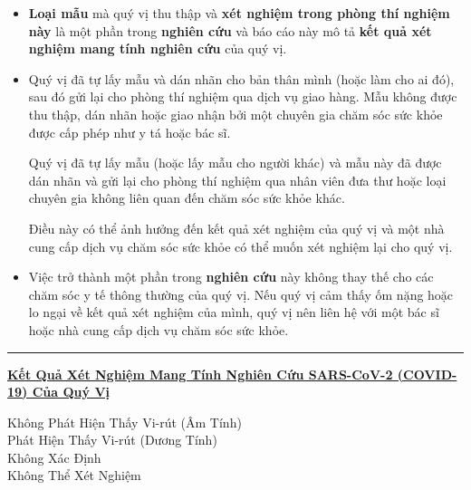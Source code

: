 \documentclass[10pt]{article}
\newcommand{\PageLine}{\rule{\textwidth}{0.25mm}}
\begin{document}
\begin{itemize}
\item

  \textbf{Loại mẫu} mà quý vị thu thập và \textbf{xét nghiệm trong phòng thí
  nghiệm này} là một phần trong \textbf{nghiên cứu} và báo cáo này mô tả
  \textbf{kết quả xét nghiệm mang tính nghiên cứu} của quý vị.

\item
  Quý vị đã tự lấy mẫu và dán nhãn cho bản thân mình (hoặc làm cho ai đó), sau
  đó gửi lại cho phòng thí nghiệm qua dịch vụ giao hàng. Mẫu không được thu
  thập, dán nhãn hoặc giao nhận bởi một chuyên gia chăm sóc sức khỏe được cấp
  phép như y tá hoặc bác sĩ.

  Quý vị đã tự lấy mẫu (hoặc lấy mẫu cho người khác) và mẫu này đã được dán nhãn
  và gửi lại cho phòng thí nghiệm qua nhân viên đưa thư hoặc loại chuyên gia
  không liên quan đến chăm sóc sức khỏe khác.



  Điều này có thể ảnh hưởng đến kết quả xét nghiệm của quý vị và một nhà cung
  cấp dịch vụ chăm sóc sức khỏe có thể muốn xét nghiệm lại cho quý vị.

\item

  Việc trở thành một phần trong \textbf{nghiên cứu} này không thay thế cho các
  chăm sóc y tế thông thường của quý vị. Nếu quý vị cảm thấy ốm nặng hoặc lo
  ngại về kết quả xét nghiệm của mình, quý vị nên liên hệ với một bác sĩ hoặc
  nhà cung cấp dịch vụ chăm sóc sức khỏe.

\end{itemize}

\bigskip
\PageLine

\large \underline{\textbf{Kết Quả Xét Nghiệm Mang Tính Nghiên Cứu SARS-CoV-2
  (COVID-19) Của Quý Vị}}

Không Phát Hiện Thấy Vi-rút (Âm Tính)\\
Phát Hiện Thấy Vi-rút (Dương Tính)\\
Không Xác Định\\
Không Thể Xét Nghiệm\\
\end{document}
